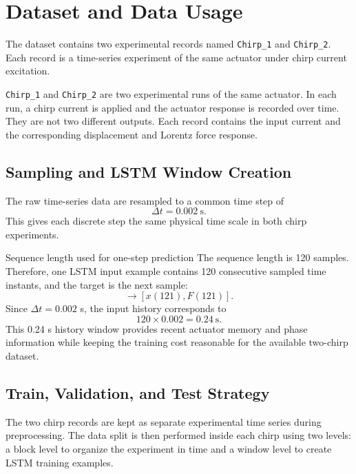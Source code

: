 \documentclass[11pt]{article}
\begin{document}
\section{Dataset and Data Usage}
The dataset contains two experimental records named \texttt{Chirp\_1} and \texttt{Chirp\_2}. Each record is a time-series experiment of the same actuator under chirp current excitation.

\texttt{Chirp\_1} and \texttt{Chirp\_2} are two experimental runs of the same actuator. In each run, a chirp current is applied and the actuator response is recorded over time. They are not two different outputs. Each record contains the input current and the corresponding displacement and Lorentz force response.

\subsection{Sampling and LSTM Window Creation}
The raw time-series data are resampled to a common time step of
\begin{equation}
\Delta t = 0.002~\text{s}.
\end{equation}
This gives each discrete step the same physical time scale in both chirp experiments.

\begin{databox}{Sequence length used for one-step prediction}
The sequence length is 120 samples. Therefore, one LSTM input example contains 120 consecutive sampled time instants, and the target is the next sample:
\begin{equation}
[I(1:120),x(1:120),F(1:120)]\rightarrow[x(121),F(121)].
\end{equation}
Since $\Delta t=0.002$ s, the input history corresponds to
\begin{equation}
120\times0.002 = 0.24~\text{s}.
\end{equation}
This 0.24 s history window provides recent actuator memory and phase information while keeping the training cost reasonable for the available two-chirp dataset.
\end{databox}


\subsection{Train, Validation, and Test Strategy}
The two chirp records are kept as separate experimental time series during preprocessing. The data split is then performed inside each chirp using two levels: a block level to organize the experiment in time and a window level to create LSTM training examples.
\end{document}
